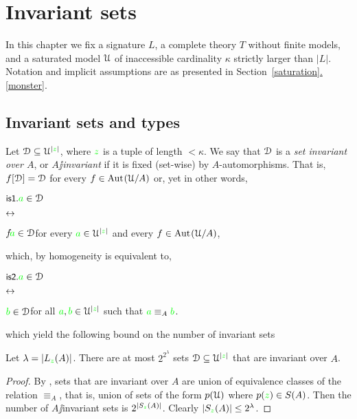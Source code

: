 \documentclass[creche.tex]{subfiles}
\begin{document}
\chapter{Invariant sets}
\label{invariant}


\def\medrel#1{\parbox[t]{6ex}{$\displaystyle\hfil #1$}}
\def\ceq#1#2#3{\parbox[t]{18ex}{$\displaystyle #1$}\medrel{#2}{$\displaystyle #3$}}

\def\mr{\color{brown}}
\def\gr{\color{green}}

In this chapter we fix a signature $L$, a complete theory $T$ without finite models, and a saturated model $\EuScript U$ of inaccessible cardinality $\kappa$ strictly larger than $|L|$. Notation and implicit assumptions are as presented in Section~\hyperref[monster]{\ref*{saturation}.\ref*{monster}}.

\section{Invariant sets and types}\label{invariant_sets}

Let $\D\subseteq\U^{|{\gr z}|}$, where ${\gr z}$ is a tuple of length $<\kappa$. We say that $\EuScript D$ is a \emph{set invariant over $A$}, or \emph{$A\jj$invariant\/} if it is fixed (set-wise) by $A$-automorphisms. That is, $f[\EuScript D]=\EuScript D$ for every $f\in\textrm{Aut\kern.15ex}(\EuScript U/A)$ or, yet in other words,

\ceq{\ssf{is1.}\hfill {\gr a}\in\D}{\iff}{f\!{\gr a}\in\D}\hfill for every ${\gr a}\in\U^{|{\gr z}|}$ and every $f\in\textrm{Aut\kern.15ex}(\EuScript U/A)$,

which, by homogeneity is equivalent to,

\ceq{\ssf{is2.}\hfill {\gr a}\in\D}{\iff}{{\gr b}\in\D}\hfill for all ${\gr a},{\gr b}\in\U^{|{\gr z}|}$ such that ${\gr a}\equiv_A{\gr b}$.

which yield the following bound on the number of invariant sets

\begin{proposition}\label{prop_numberIS}
  Let $\lambda=|L_{\gr z}(A)|$. There are at most $2^{2^{\lambda}}$ sets $\D\subseteq\U^{|{\gr z}|}$ that are invariant over $A$.
\end{proposition}
\begin{proof}
By , sets that are invariant over $A$ are union of equivalence classes of the relation $\equiv_A$, that is, union of sets of the form $p(\EuScript U)$ where $p({\gr z})\in S(A)$. Then the number of $A\jj$invariant sets is $2^{|S_{\gr z}(A)|}$. Clearly $|S_{\gr z}(A)|\le 2^\lambda$.
\end{proof} 
\end{document}
